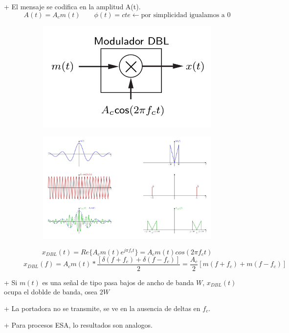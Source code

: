 \documentclass[a4paper, 10pt]{article}
\begin{document}
+ El mensaje se codifica en la amplitud A(t). $$ A(t) = A_c m(t) \quad\quad \phi(t)= cte \leftarrow \text{por simplicidad igualamos a 0}$$

\begin{figure}[!h]
    \centering
    \begin{subfigure}{.5\textwidth} %
        \includegraphics[scale = 0.4]{./modulador.png}
    \end{subfigure}%
    \begin{subfigure}{.5\textwidth} %
        \includegraphics[scale = 0.3]{./espectro.png}    
    \end{subfigure}
    $$x_{DBL}(t) = Re \{ A_c m(t) e^{j \pi f_ct} \} = A_c m(t) cos(2 \pi f_c t)$$
    $$ x_{DBL}(f) = A_c m(t) * \frac{[\delta(f+f_c) + \delta(f-f_c)]}{2} = \frac{A_c}{2} [m(f+f_c) + m(f-f_c)] $$
\end{figure}

+ Si $m(t)$ es una señal de tipo pasa bajos de ancho de banda $W$, $x_{DBL}(t)$ ocupa el doblde de banda, osea $2W$

+ La portadora no se transmite, se ve en la ausencia de deltas en $f_c$.

+ Para procesos ESA, lo resultados son analogos.
\end{document}
